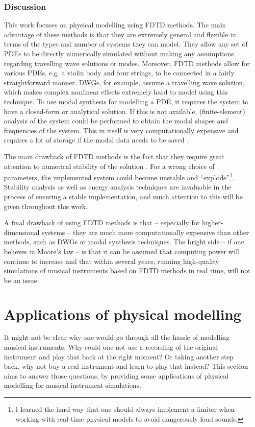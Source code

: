 \subsubsection{Discussion}
This work focuses on physical modelling using FDTD methods. The main advantage of these methods is that they are extremely general and flexible in terms of the types and number of systems they can model. They allow any set of PDEs to be directly numerically simulated without making any assumptions regarding travelling wave solutions or modes. Moreover, FDTD methods allow for various PDEs, e.g. a violin body and four strings, to be connected in a fairly straightforward manner. DWGs, for example, assume a travelling wave solution, which makes complex nonlinear effects extremely hard to model using this technique. To use modal synthesis for modelling a PDE, it requires the system to have a closed-form or analytical solution. If this is not available, (finite-element) analysis of the system could be performed to obtain the modal shapes and frequencies of the system. This in itself is very computationally expensive and requires a lot of storage if the modal data needs to be saved \cite{Bilbao2019CMJa}.
 
The main drawback of FDTD methods is the fact that they require great attention to numerical stability of the solution \cite{theBible}. For a wrong choice of parameters, the implemented system could become unstable and ``explode''\footnote{I learned the hard way that one should always implement a limiter when working with real-time physical models to avoid dangerously loud sounds.}. Stability analysis as well as energy analysis techniques are invaluable in the process of ensuring a stable implementation, and much attention to this will be given throughout this work.

A final drawback of using FDTD methods is that -- especially for higher-dimensional systems -- they are much more computationally expensive than other methods, such as DWGs or modal synthesis techniques. The bright side -- if one believes in Moore's law \cite{Moore1965} -- is that it can be assumed that computing power will continue to increase and that within several years, running high-quality simulations of musical instruments based on FDTD methods in real time, will not be an issue.

\section{Applications of physical modelling}\label{sec:why}
It might not be clear why one would go through all the hassle of modelling musical instruments. Why could one not use a recording of the original instrument and play that back at the right moment? Or taking another step back, why not buy a real instrument and learn to play that instead? This section aims to answer those questions, by providing some applications of physical modelling for musical instrument simulations.

